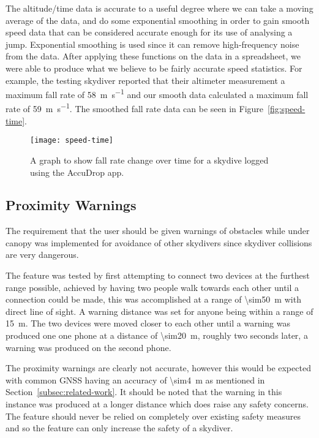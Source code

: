 The altitude/time data is accurate to a useful degree where we can take a moving average of the data, and do some exponential smoothing in order to gain smooth speed data that can be considered accurate enough for its use of analysing a jump. Exponential smoothing is used since it can remove high-frequency noise from the data. After applying these functions on the data in a spreadsheet, we were able to produce what we believe to be fairly accurate speed statistics. For example, the testing skydiver reported that their altimeter measurement a maximum fall rate of \SI{58}{\metre\per\second} and our smooth data calculated a maximum fall rate of \SI{59}{\metre\per\second}. The smoothed fall rate data can be seen in Figure~\vref{fig:speed-time}.

\begin{figure}[ht]
  \centering
  \texttt{[image: speed-time]}
  \caption{A graph to show fall rate change over time for a skydive logged using the AccuDrop app.}\label{fig:speed-time}
\end{figure}

\subsection{Proximity Warnings}
The requirement that the user should be given warnings of obstacles while under canopy was implemented for avoidance of other skydivers since skydiver collisions are very dangerous.

The feature was tested by first attempting to connect two devices at the furthest range possible, achieved by having two people walk towards each other until a connection could be made, this was accomplished at a range of \SI{\sim50}{\metre} with direct line of sight. A warning distance was set for anyone being within a range of \SI{15}{\metre}. The two devices were moved closer to each other until a warning was produced one one phone at a distance of \SI{\sim20}{\metre}, roughly two seconds later, a warning was produced on the second phone.

The proximity warnings are clearly not accurate, however this would be expected with common GNSS having an accuracy of \SI{\sim4}{\metre} as mentioned in Section~\ref{subsec:related-work}. It should be noted that the warning in this instance was produced at a longer distance which does raise any safety concerns. The feature should never be relied on completely over existing safety measures and so the feature can only increase the safety of a skydiver.

